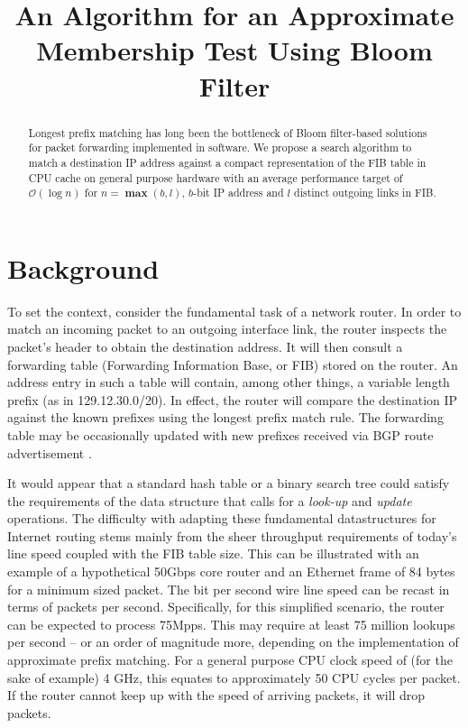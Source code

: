 \documentclass[conference,compsoc]{IEEEtran}
\begin{document}
\title{An Algorithm for an Approximate Membership Test Using Bloom Filter}
\author{
}

\maketitle

\begin{abstract}
Longest prefix matching has long been the bottleneck of Bloom
filter-based solutions for packet forwarding implemented in software.
We propose a search algorithm to match a destination IP address against a
compact representation of the FIB table in CPU cache on general purpose
hardware with an average performance target of
$\mathcal{O}(\log n)$ for $n = \bm{\max}(b, l)$, $b$-bit IP address and
$l$ distinct outgoing links in FIB.

\end{abstract}

\section{Background}
To set the context, consider the fundamental task of a network router.
In order to match an incoming packet to an outgoing interface link,
the router inspects the packet's header to obtain the destination address.
It will then consult a forwarding table (Forwarding Information Base, 
or FIB) stored on the router.
An address entry in such a table will contain, among other things,
a variable length prefix (as in 129.12.30.0/20).
In effect, the router will compare the destination IP
against the known prefixes using the longest prefix match rule.
The forwarding table may be occasionally updated with new prefixes
received via BGP route advertisement \cite{Kurose:Networking}.

It would appear that a standard hash table or a binary search tree could
satisfy the requirements of the data structure that calls for a
\textit{look-up} and \textit{update} operations. The difficulty with
adapting these fundamental datastructures for Internet routing stems 
mainly from the sheer throughput requirements of today's line speed coupled
with the FIB table size.
This can be illustrated with an example of a hypothetical 50Gbps core router 
and an Ethernet frame of 84 bytes for a minimum sized packet.
The bit per second
wire line speed can be recast in terms of packets per second. Specifically,
for this simplified scenario, the router can be expected to process 75Mpps. 
This may require at least 75 million lookups per second -- or an order of
magnitude more, depending on the implementation of approximate prefix
matching.
For a general purpose CPU clock
speed of (for the sake of example) 4 GHz, this equates to approximately 
50 CPU cycles per packet. If the router cannot keep up with the speed of
arriving packets, it will drop packets.
\end{document}
